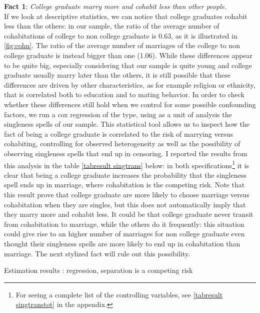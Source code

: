 \documentclass[12pt]{article}
\begin{document}
\textbf{Fact 1}: \textit{College graduate marry more and cohabit less than other people.}\\
If we look at descriptive statistics, we can notice that college graduates cohabit less than the others: in our sample, the ratio of the average number of cohabitations of college to non college graduate is 0.63, as it is illustrated in \autoref{fig:cohn}. The ratio of the average number of marriages of the college to non college graduate is instead bigger than one (1.06). While these differences appear to be quite big, especially considering that our sample is quite young and college graduate usually marry later than the others, it is still possible that these differences are driven by other characteristics, as for example religion or ethnicity, that is correlated both to education and to mating behavior. In order to check whether these differences still hold when we control for some possible confounding factors, we run a cox regression of the \citet{fine1999} type, using as a unit of analysis the singleness spells of our sample. This statistical tool allows us to inspect how the fact of being a college graduate is correlated to the risk of marrying versus cohabiting, controlling for observed heterogeneity as well as the possibility of observing singleness spells that end up in censoring. I reported the results from this analysis in the table \autoref{tabresult singtrans} below: in both specifications\footnote{For seeing a complete list of the controlling variables, see \autoref*{tabresult singtranstot} in the appendix.} it is clear that being a college graduate increases the probability that the singleness spell ends up in marriage, where cohabitation is the competing risk.
Note that this result prove that college graduate are more likely to choose marriage versus cohabitation when they are singles, but this does not automatically imply that they marry more and cohabit less. It could be that college graduate never transit from cohabitation to marriage, while the others do it frequently: this situation could give rise to an higher number of marriages for non college graduate even thought their singleness spells are more likely to end up in cohabitation than marriage. The next stylized fact will rule out this possibility.\\
{	
	\def\onepc{$^{\ast\ast}$} \def\fivepc{$^{\ast}$}
	\def\tenpc{$^{\dag}$}
	\def\legend{\multicolumn{3}{l}{\footnotesize{Significance levels
				:\hspace{1em} $\ast$ : 10\% \hspace{1em}
				$\ast\ast$ : 5\% \hspace{1em} $\ast\ast\ast$ : 1\% \normalsize}}}
	\begin{table}[htbp]\centering
		\caption{Estimation results : \citet{fine1999} regression, separation is a competing risk
			\label{tabresult singtrans}}
		
	\end{table}
}
\end{document}
